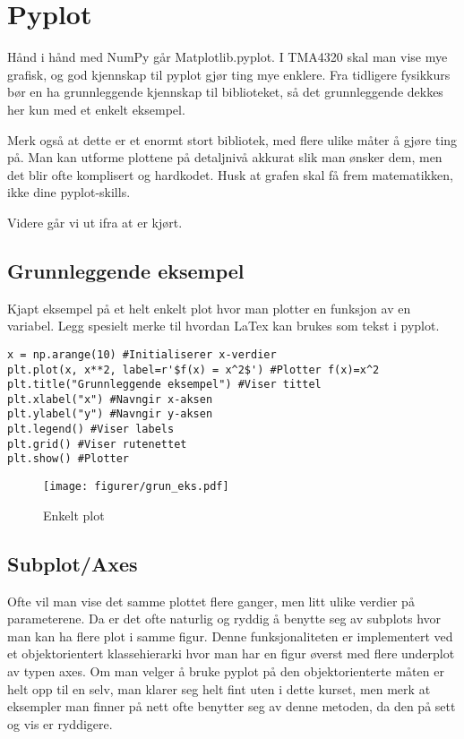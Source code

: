 \documentclass[a4paper,12pt]{article}
\begin{document}
\section{Pyplot}
Hånd i hånd med NumPy går Matplotlib.pyplot. I TMA4320 skal man vise mye grafisk, og god kjennskap til pyplot gjør ting mye enklere. Fra tidligere fysikkurs bør en ha grunnleggende kjennskap til biblioteket, så det grunnleggende dekkes her kun med et enkelt eksempel. 

\begin{mdframed}[frametitle={Tips!}]
Merk også at dette er et enormt stort bibliotek, med flere ulike måter å gjøre ting på. Man kan utforme plottene på detaljnivå akkurat slik man ønsker dem, men det blir ofte komplisert og hardkodet. Husk at grafen skal få frem matematikken, ikke dine pyplot-skills.
\end{mdframed}

Videre går vi ut ifra at  er kjørt.

\subsection{Grunnleggende eksempel}
Kjapt eksempel på et helt enkelt plot hvor man plotter en funksjon av en variabel. Legg spesielt merke til hvordan LaTex kan brukes som tekst i pyplot.

\begin{lstlisting}
x = np.arange(10) #Initialiserer x-verdier
plt.plot(x, x**2, label=r'$f(x) = x^2$') #Plotter f(x)=x^2
plt.title("Grunnleggende eksempel") #Viser tittel
plt.xlabel("x") #Navngir x-aksen
plt.ylabel("y") #Navngir y-aksen
plt.legend() #Viser labels
plt.grid() #Viser rutenettet
plt.show() #Plotter
\end{lstlisting}

\begin{figure}[ht]
    \centering
    \texttt{[image: figurer/grun\_eks.pdf]}
    \caption{Enkelt plot}
    \label{fig:grun_eks.pdf}
\end{figure}


\subsection{Subplot/Axes}
Ofte vil man vise det samme plottet flere ganger, men litt ulike verdier på parameterene. Da er det ofte naturlig og ryddig å benytte seg av subplots hvor man kan ha flere plot i samme figur. Denne funksjonaliteten er implementert ved et objektorientert klassehierarki hvor man har en figur øverst med flere underplot av typen axes. Om man velger å bruke pyplot på den objektorienterte måten er helt opp til en selv, man klarer seg helt fint uten i dette kurset, men merk at eksempler man finner på nett ofte benytter seg av denne metoden, da den på sett og vis er ryddigere.
\end{document}
